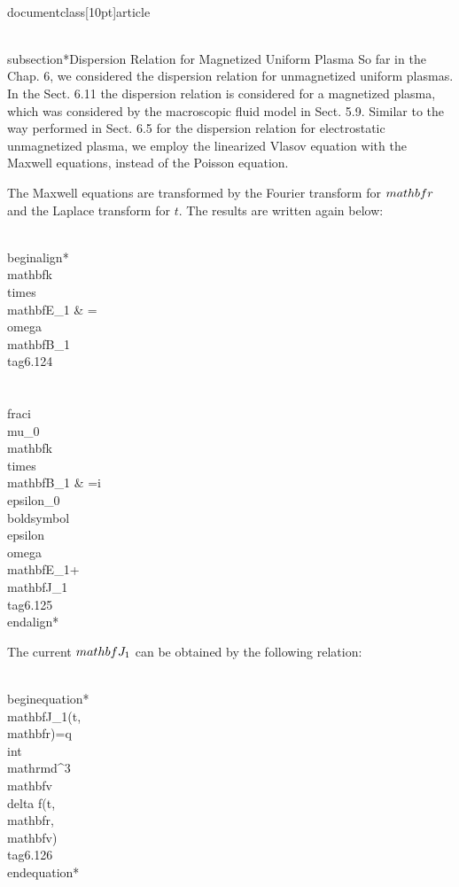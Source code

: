 \\documentclass[10pt]{article}
\begin{document}
{{{{\\subsection*{Dispersion Relation for Magnetized Uniform Plasma}
So far in the Chap. 6, we considered the dispersion relation for unmagnetized uniform plasmas. In the Sect. 6.11 the dispersion relation is considered for a magnetized plasma, which was considered by the macroscopic fluid model in Sect. 5.9. Similar to the way performed in Sect. 6.5 for the dispersion relation for electrostatic unmagnetized plasma, we employ the linearized Vlasov equation with the Maxwell equations, instead of the Poisson equation.

The Maxwell equations are transformed by the Fourier transform for $\\mathbf{r}$ and the Laplace transform for $t$. The results are written again below:


\\begin{align*}
\\mathbf{k} \\times \\mathbf{E}_{1} & =\\omega \\mathbf{B}_{1}  \\tag{6.124}\\\\
\\frac{i}{\\mu_{0}} \\mathbf{k} \\times \\mathbf{B}_{1} & =i \\epsilon_{0} \\boldsymbol{\\epsilon} \\omega \\mathbf{E}_{1}+\\mathbf{J}_{1} \\tag{6.125}
\\end{align*}


The current $\\mathbf{J}_{1}$ can be obtained by the following relation:


\\begin{equation*}
\\mathbf{J}_{1}(t, \\mathbf{r})=q \\int \\mathrm{d}^{3} \\mathbf{v} \\delta f(t, \\mathbf{r}, \\mathbf{v}) \\tag{6.126}
\\end{equation*}


}}}}
\end{document}
